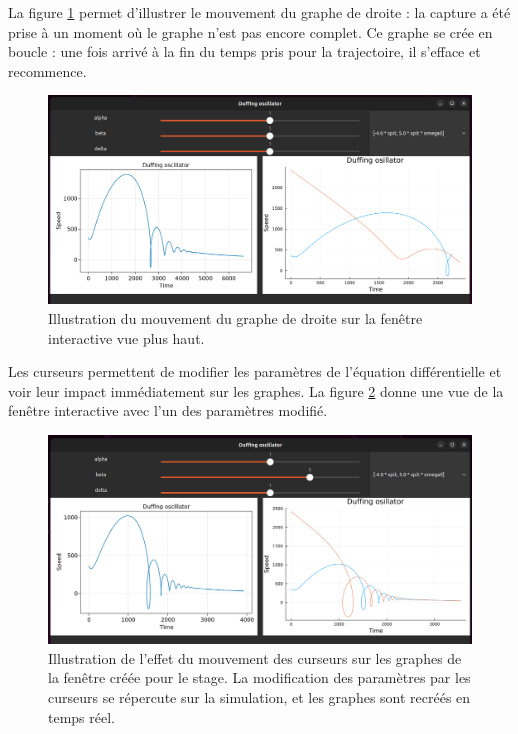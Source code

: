 \documentclass[a4paper, french, 12pt, titlepage]{article}
\begin{document}
La figure \ref{fig:fig3} permet d'illustrer le mouvement du graphe de droite : la capture a été prise à un moment où le graphe n'est pas encore complet.
Ce graphe se crée en boucle : une fois arrivé à la fin du temps pris pour la trajectoire, il s'efface et recommence. 

\begin{figure}[htb]
  \includegraphics[width=\linewidth]{interactivewindow_2.png}
  \caption{Illustration du mouvement du graphe de droite sur la fenêtre interactive vue plus haut.}
  \label{fig:fig3}
\end{figure}


Les curseurs permettent de modifier les paramètres de l'équation différentielle et voir leur impact immédiatement sur les graphes.
La figure \ref{fig:fig4} donne une vue de la fenêtre interactive avec l'un des paramètres modifié. 


\begin{figure}[H]
  \includegraphics[width=\linewidth]{interactivewindow_3.png}
  \caption{Illustration de l'effet du mouvement des curseurs sur les graphes de la fenêtre créée pour le stage. La modification des paramètres par les curseurs se répercute sur la simulation, et les graphes sont recréés en temps réel.}
  \label{fig:fig4}
\end{figure}
\end{document}
